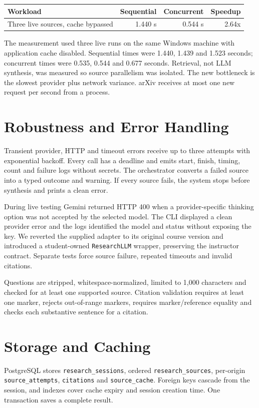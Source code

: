 \documentclass[11pt,a4paper]{article}
\begin{document}
\begin{center}
\begin{tabular}{lrrr}
\toprule
Workload & Sequential & Concurrent & Speedup\\
\midrule
Three live sources, cache bypassed & 1.440 s & 0.544 s & 2.64x\\
\bottomrule
\end{tabular}
\end{center}

The measurement used three live runs on the same Windows machine with application cache disabled.
Sequential times were 1.440, 1.439 and 1.523 seconds; concurrent times were 0.535, 0.544 and
0.677 seconds. Retrieval, not LLM synthesis, was measured so source parallelism was isolated. The
new bottleneck is the slowest provider plus network variance. arXiv receives at most one new
request per second from a process.

\section{Robustness and Error Handling}
Transient provider, HTTP and timeout errors receive up to three attempts with exponential backoff.
Every call has a deadline and emits start, finish, timing, count and failure logs without secrets.
The orchestrator converts a failed source into a typed outcome and warning. If every source fails,
the system stops before synthesis and prints a clean error.

During live testing Gemini returned HTTP 400 when a provider-specific thinking option was not
accepted by the selected model. The CLI displayed a clean provider error and the logs identified
the model and status without exposing the key. We reverted the supplied adapter to its original
course version and introduced a student-owned \texttt{ResearchLLM} wrapper, preserving the
instructor contract. Separate tests force source failure, repeated timeouts and invalid citations.

Questions are stripped, whitespace-normalized, limited to 1,000 characters and checked for at least
one supported source. Citation validation requires at least one marker, rejects out-of-range markers,
requires marker/reference equality and checks each substantive sentence for a citation.

\section{Storage and Caching}
PostgreSQL stores \texttt{research\_sessions}, ordered \texttt{research\_sources}, per-origin
\texttt{source\_attempts}, \texttt{citations} and \texttt{source\_cache}. Foreign keys cascade from
the session, and indexes cover cache expiry and session creation time. One transaction saves a
complete result.
\end{document}
